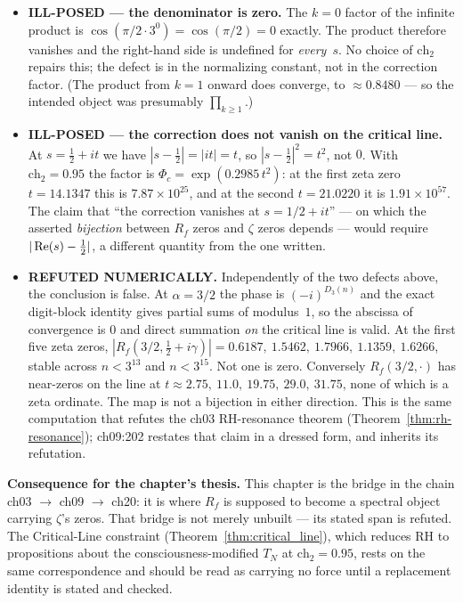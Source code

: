 \begin{itemize}
\item \textbf{ILL-POSED --- the denominator is zero.} The $k=0$ factor of the
infinite product is $\cos(\pi/2\cdot 3^{0})=\cos(\pi/2)=0$ exactly. The product
therefore vanishes and the right-hand side is undefined for \emph{every}~$s$.
No choice of $\mathrm{ch}_2$ repairs this; the defect is in the normalizing
constant, not in the correction factor. (The product from $k=1$ onward does
converge, to $\approx 0.8480$ --- so the intended object was presumably
$\prod_{k\ge1}$.)
\item \textbf{ILL-POSED --- the correction does not vanish on the critical
line.} At $s=\tfrac12+it$ we have $|s-\tfrac12|=|it|=t$, so
$|s-\tfrac12|^2=t^2$, not $0$. With $\mathrm{ch}_2=0.95$ the factor is
$\Phi_c=\exp(0.2985\,t^2)$: at the first zeta zero $t=14.1347$ this is
$7.87\times10^{25}$, and at the second $t=21.0220$ it is $1.91\times10^{57}$.
The claim that ``the correction vanishes at $s=1/2+it$'' --- on which the
asserted \emph{bijection} between $R_f$ zeros and $\zeta$ zeros depends ---
would require $|\operatorname{Re}(s)-\tfrac12|$, a different quantity from the one written.
\item \textbf{REFUTED NUMERICALLY.} Independently of the two defects above, the
conclusion is false. At $\alpha=3/2$ the phase is $(-i)^{D_3(n)}$ and the exact
digit-block identity gives partial sums of modulus~$1$, so the abscissa of
convergence is $0$ and direct summation \emph{on} the critical line is valid.
At the first five zeta zeros,
$|R_f(3/2,\tfrac12+i\gamma)| = 0.6187,\ 1.5462,\ 1.7966,\ 1.1359,\ 1.6266$,
stable across $n<3^{13}$ and $n<3^{15}$. Not one is zero. Conversely
$R_f(3/2,\cdot)$ has near-zeros on the line at $t\approx 2.75,\ 11.0,\ 19.75,
\ 29.0,\ 31.75$, none of which is a zeta ordinate. The map is not a bijection
in either direction. This is the same computation that refutes the ch03
RH-resonance theorem (Theorem~\ref{thm:rh-resonance}); ch09:202 restates that
claim in a dressed form, and inherits its refutation.
\end{itemize}

\noindent \textbf{Consequence for the chapter's thesis.} This chapter is the
bridge in the chain ch03 $\to$ ch09 $\to$ ch20: it is where $R_f$ is supposed
to become a spectral object carrying $\zeta$'s zeros. That bridge is not merely
unbuilt --- its stated span is refuted. The Critical-Line constraint
(Theorem~\ref{thm:critical_line}), which reduces RH to propositions about the
consciousness-modified $T_N$ at $\mathrm{ch}_2=0.95$, rests on the same
correspondence and should be read as carrying no force until a replacement
identity is stated and checked.

